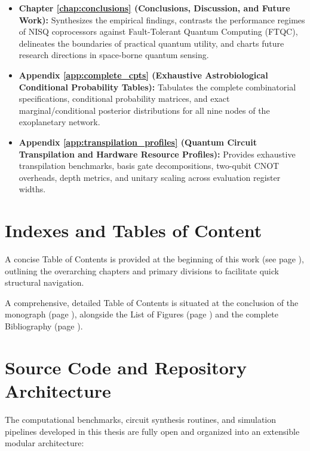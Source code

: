 \begin{itemize}
    \item \textbf{Chapter \ref{chap:conclusions} (Conclusions, Discussion, and Future Work):} Synthesizes the empirical findings, contrasts the performance regimes of NISQ coprocessors against Fault-Tolerant Quantum Computing (FTQC), delineates the boundaries of practical quantum utility, and charts future research directions in space-borne quantum sensing.
    \item \textbf{Appendix \ref{app:complete_cpts} (Exhaustive Astrobiological Conditional Probability Tables):} Tabulates the complete combinatorial specifications, conditional probability matrices, and exact marginal/conditional posterior distributions for all nine nodes of the exoplanetary network.
    \item \textbf{Appendix \ref{app:transpilation_profiles} (Quantum Circuit Transpilation and Hardware Resource Profiles):} Provides exhaustive transpilation benchmarks, basis gate decompositions, two-qubit CNOT overheads, depth metrics, and unitary scaling across evaluation register widths.
\end{itemize}

\section*{Indexes and Tables of Content}
A concise Table of Contents is provided at the beginning of this work (see page \pageref{label:short_toc}), outlining the overarching chapters and primary divisions to facilitate quick structural navigation.

A comprehensive, detailed Table of Contents is situated at the conclusion of the monograph (page \pageref{label:full_toc}), alongside the List of Figures (page \pageref{label:list_of_figures}) and the complete Bibliography (page \pageref{label:bib_references}).

\section*{Source Code and Repository Architecture}
The computational benchmarks, circuit synthesis routines, and simulation pipelines developed in this thesis are fully open and organized into an extensible modular architecture:

